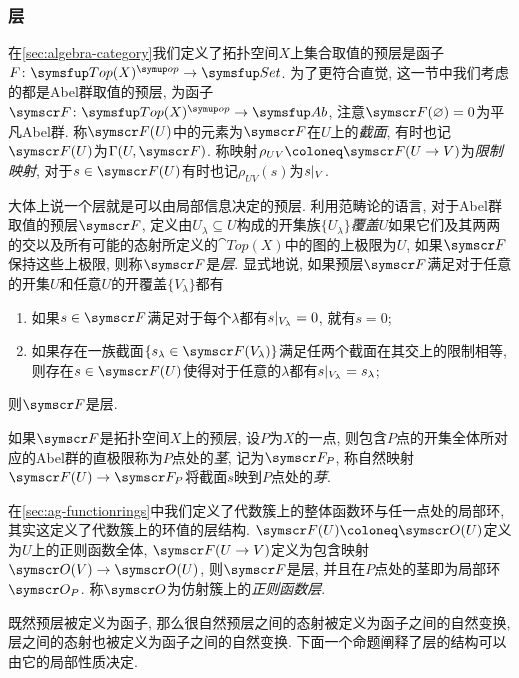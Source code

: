 \subsubsection{层}

在\ref{sec:algebra-category}我们定义了拓扑空间$X$上集合取值的预层是函子$F\colon \cat{Top}(X)^{\op}\to\cat{Set}$. 为了更符合直觉, 这一节中我们考虑的都是Abel群取值的预层, 为函子$\sheaf{F}\colon \cat{Top}(X)^{\op}\to\cat{Ab}$, 注意$\sheaf{F}(\varnothing)=0$为平凡Abel群. 称$\sheaf{F}(U)$中的元素为$\sheaf{F}$在$U$上的\emph{截面}, 有时也记$\sheaf{F}(U)$为$\Gamma (U, \sheaf{F})$. 称映射$\rho_{UV}\coloneq \sheaf{F}(U\to V)$为\emph{限制映射}, 对于$s\in \sheaf{F}(U)$有时也记$\rho_{UV}(s)$为$s\vert_{V}$.

大体上说一个层就是可以由局部信息决定的预层. 利用范畴论的语言, 对于Abel群取值的预层$\sheaf{F}$, 定义由$U_\lambda\subseteq U$构成的开集族$\{U_\lambda\}$\emph{覆盖}$U$如果它们及其两两的交以及所有可能的态射所定义的$\cat{Top}(X)$中的图的上极限为$U$, 如果$\sheaf{F}$保持这些上极限, 则称$\sheaf{F}$是\emph{层}. 显式地说, 如果预层$\sheaf{F}$满足对于任意的开集$U$和任意$U$的开覆盖$\{V_\lambda\}$都有
\begin{enumerate}
  \item 如果$s\in\sheaf{F}$满足对于每个$\lambda$都有$s\vert_{V_{\lambda}}=0$, 就有$s=0$;
  \item 如果存在一族截面$\{s_\lambda\in\sheaf{F(V_\lambda)}\}$满足任两个截面在其交上的限制相等, 则存在$s\in\sheaf{F(U)}$使得对于任意的$\lambda$都有$s\vert_{V_\lambda}=s_{\lambda}$;
\end{enumerate}
则$\sheaf{F}$是层.

如果$\sheaf{F}$是拓扑空间$X$上的预层, 设$P$为$X$的一点, 则包含$P$点的开集全体所对应的Abel群的直极限称为$P$点处的\emph{茎}, 记为$\sheaf{F}_P$, 称自然映射$\sheaf{F}(U)\to \sheaf{F}_P$将截面$s$映到$P$点处的\emph{芽}.

\begin{example}
  在\ref{sec:ag-functionrings}中我们定义了代数簇上的整体函数环与任一点处的局部环, 其实这定义了代数簇上的环值的层结构. $\sheaf{F}(U)\coloneq\OO (U)$定义为$U$上的正则函数全体, $\sheaf{F}(U\to V)$定义为包含映射$\OO (V)\to \OO(U)$, 则$\sheaf{F}$是层, 并且在$P$点处的茎即为局部环$\OO_P$. 称$\OO$为仿射簇上的\emph{正则函数层}.
\end{example}

既然预层被定义为函子, 那么很自然预层之间的态射被定义为函子之间的自然变换, 层之间的态射也被定义为函子之间的自然变换. 下面一个命题阐释了层的结构可以由它的局部性质决定.


